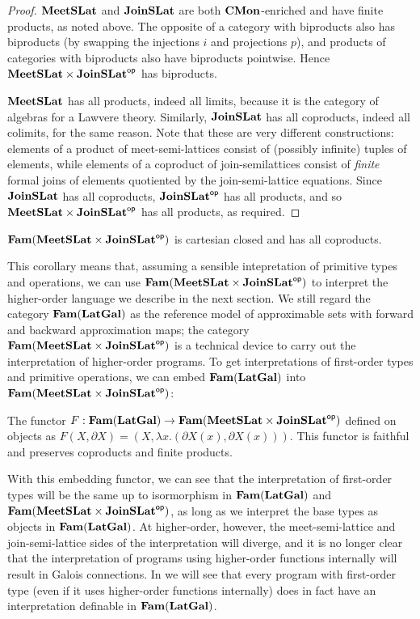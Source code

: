 \begin{proof}
  $\mathbf{MeetSLat}$ and $\mathbf{JoinSLat}$ are both $\mathbf{CMon}$-enriched and have
  finite products, as noted above. The opposite of a category with
  biproducts also has biproducts (by swapping the injections $i$ and
  projections $p$), and products of categories with biproducts also
  have biproducts pointwise. Hence $\mathbf{MeetSLat} \times \mathbf{JoinSLat}^{\mathsf{op}}$
  has biproducts.

  $\mathbf{MeetSLat}$ has all products, indeed all limits, because it is the
  category of algebras for a Lawvere theory. Similarly, $\mathbf{JoinSLat}$
  has all coproducts, indeed all colimits, for the same reason. Note
  that these are very different constructions: elements of a product
  of meet-semi-lattices consist of (possibly infinite) tuples of
  elements, while elements of a coproduct of join-semilattices consist
  of \emph{finite} formal joins of elements quotiented by the
  join-semi-lattice equations. Since $\mathbf{JoinSLat}$ has all coproducts,
  $\mathbf{JoinSLat}^{\mathsf{op}}$ has all products, and so
  $\mathbf{MeetSLat} \times \mathbf{JoinSLat}^{\mathsf{op}}$ has all products, as required.
\end{proof}

\begin{corollary}
  $\mathbf{Fam}(\mathbf{MeetSLat} \times \mathbf{JoinSLat}^{\mathsf{op}})$ is cartesian closed and has
  all coproducts.
\end{corollary}

This corollary means that, assuming a sensible intepretation of
primitive types and operations, we can use
$\mathbf{Fam}(\mathbf{MeetSLat} \times \mathbf{JoinSLat}^{\mathsf{op}})$ to interpret the higher-order
language we describe in the next section. We still regard the category
$\mathbf{Fam}(\mathbf{LatGal})$ as the reference model of approximable sets with
forward and backward approximation maps; the category
$\mathbf{Fam}(\mathbf{MeetSLat} \times \mathbf{JoinSLat}^{\mathsf{op}})$ is a technical device to carry
out the interpretation of higher-order programs. To get
interpretations of first-order types and primitive operations, we can
embed $\mathbf{Fam}(\mathbf{LatGal})$ into $\mathbf{Fam}(\mathbf{MeetSLat} \times \mathbf{JoinSLat}^{\mathsf{op}})$:

\begin{proposition}
  The functor
  $F : \mathbf{Fam}(\mathbf{LatGal}) \to \mathbf{Fam}(\mathbf{MeetSLat} \times \mathbf{JoinSLat}^{\mathsf{op}})$ defined
  on objects as
  $F(X, \partial X) = (X, \lambda x. (\partial X(x), \partial
  X(x)))$. This functor is faithful and preserves coproducts and
  finite products.
\end{proposition}

With this embedding functor, we can see that the interpretation of
first-order types will be the same up to isormorphism in
$\mathbf{Fam}(\mathbf{LatGal})$ and $\mathbf{Fam}(\mathbf{MeetSLat} \times \mathbf{JoinSLat}^{\mathsf{op}})$, as long as
we interpret the base types as objects in $\mathbf{Fam}(\mathbf{LatGal})$. At
higher-order, however, the meet-semi-lattice and join-semi-lattice
sides of the interpretation will diverge, and it is no longer clear
that the interpretation of programs using higher-order functions
internally will result in Galois connections. In 
we will see that every program with first-order type (even if it uses
higher-order functions internally) does in fact have an interpretation
definable in $\mathbf{Fam}(\mathbf{LatGal})$.

